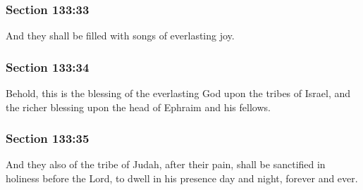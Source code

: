 	\subsubsection{Section 133:33} %
		\label{DC133-33}

		And they shall be filled with songs of everlasting joy.


	\subsubsection{Section 133:34} %
		\label{DC133-34}

		Behold, this is the blessing of the everlasting God upon the tribes of Israel, and the richer blessing upon the head of Ephraim and his fellows.


	\subsubsection{Section 133:35} %
		\label{DC133-35}

		And they also of the tribe of Judah, after their pain, shall be sanctified in holiness before the Lord, to dwell in his presence day and night, forever and ever.


